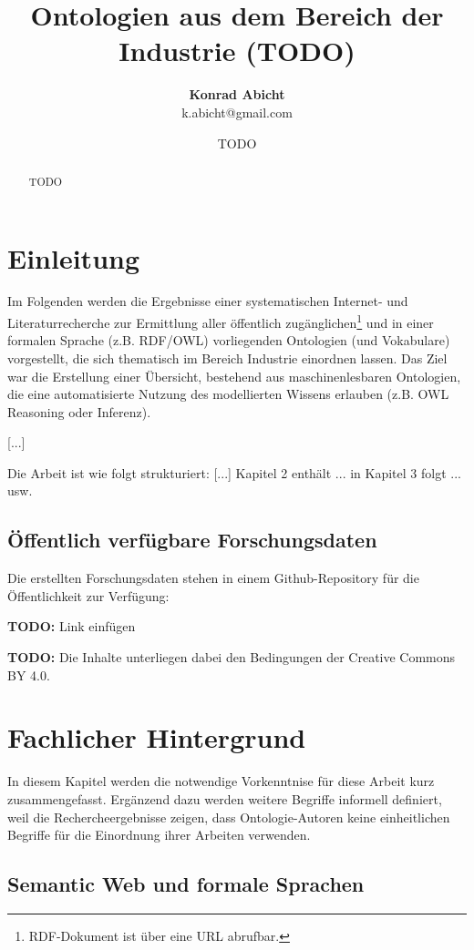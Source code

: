 \documentclass{article}
\title{Ontologien aus dem Bereich der Industrie (TODO)}
\author{\textbf{Konrad Abicht} \\ k.abicht@gmail.com}
\date{TODO}
\begin{document}
\maketitle

\begin{abstract}
    TODO
\end{abstract}

\section{Einleitung}

Im Folgenden werden die Ergebnisse einer systematischen Internet- und Literaturrecherche zur Ermittlung aller öffentlich zugänglichen\footnote{RDF-Dokument ist über eine URL abrufbar.} und in einer formalen Sprache (z.B. RDF/OWL) vorliegenden Ontologien (und Vokabulare) vorgestellt, die sich thematisch im Bereich Industrie einordnen lassen.
Das Ziel war die Erstellung einer Übersicht, bestehend aus maschinenlesbaren Ontologien, die eine automatisierte Nutzung des modellierten Wissens erlauben (z.B. OWL Reasoning oder Inferenz).

[...]

Die Arbeit ist wie folgt strukturiert: [...] Kapitel 2 enthält ... in Kapitel 3 folgt ... usw.

\subsection{Öffentlich verfügbare Forschungsdaten}

Die erstellten Forschungsdaten stehen in einem Github-Repository für die Öffentlichkeit zur Verfügung:

\textbf{TODO:} Link einfügen

\textbf{TODO:} Die Inhalte unterliegen dabei den Bedingungen der Creative Commons BY 4.0.

\section{Fachlicher Hintergrund}

In diesem Kapitel werden die notwendige Vorkenntnise für diese Arbeit kurz zusammengefasst.
Ergänzend dazu werden weitere Begriffe informell definiert, weil die Rechercheergebnisse zeigen, dass Ontologie-Autoren keine einheitlichen Begriffe für die Einordnung ihrer Arbeiten verwenden.

\subsection{Semantic Web und formale Sprachen}
\end{document}
